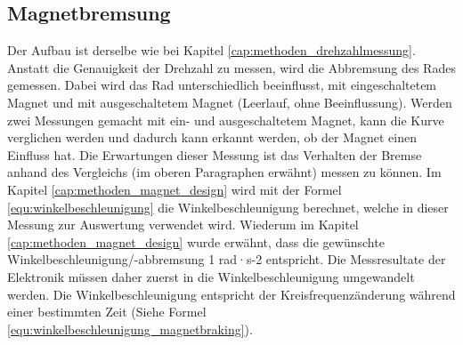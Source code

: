 \subsection{Magnetbremsung} \label{cap:methoden_magnetbremsung}

Der Aufbau ist derselbe wie bei Kapitel \ref{cap:methoden_drehzahlmessung}. Anstatt die Genauigkeit der Drehzahl zu messen, wird die Abbremsung des Rades gemessen. Dabei wird das Rad unterschiedlich beeinflusst, mit eingeschaltetem Magnet und mit ausgeschaltetem Magnet (Leerlauf, ohne Beeinflussung). Werden zwei Messungen gemacht mit ein- und ausgeschaltetem Magnet, kann die Kurve verglichen werden und dadurch kann erkannt werden, ob der Magnet einen Einfluss hat.
\newpara
Die Erwartungen dieser Messung ist das Verhalten der Bremse anhand des Vergleichs (im oberen Paragraphen erwähnt) messen zu können. Im Kapitel \ref{cap:methoden_magnet_design} wird mit der Formel \ref{equ:winkelbeschleunigung} die Winkelbeschleunigung berechnet, welche in dieser Messung zur Auswertung verwendet wird. Wiederum im Kapitel \ref{cap:methoden_magnet_design} wurde erwähnt, dass die gewünschte Winkelbeschleunigung/-abbremsung 1 rad·s-2 entspricht. Die Messresultate der Elektronik müssen daher zuerst in die Winkelbeschleunigung umgewandelt werden. Die Winkelbeschleunigung entspricht der Kreisfrequenzänderung während einer bestimmten Zeit (Siehe Formel \ref{equ:winkelbeschleunigung_magnetbraking}).

